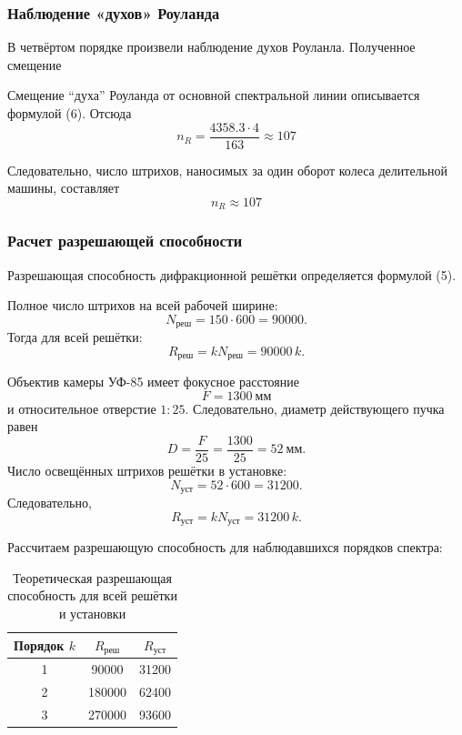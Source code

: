 \documentclass[12pt,a5paper,titlepage, main = russian]{article}
\begin{document}
\subsubsection{Наблюдение «духов» Роуланда}
В четвёртом порядке произвели наблюдение духов Роуланла. Полученное смещение

\begin{table}[H]
\centering
 \renewcommand{\arraystretch}{1.5}
\caption{Результаты наблюдения духа Роуланда в четвёртом порядке}
\end{table}

Смещение ``духа'' Роуланда от основной спектральной линии описывается формулой (6). Отсюда
\[
n_R = \frac{4358.3 \cdot 4}{163} \approx 107
\]

Следовательно, число штрихов, наносимых за один оборот колеса делительной машины, составляет
\[
\boxed{n_R \approx 107}
\]
\subsubsection{Расчет разрешающей способности}
Разрешающая способность дифракционной решётки определяется формулой
(5).

Полное число штрихов на всей рабочей ширине:
\[
N_{\text{реш}} = 150 \cdot 600 = 90000.
\]
Тогда для всей решётки:
\[
R_{\text{реш}} = k N_{\text{реш}} = 90000\,k.
\]

Объектив камеры УФ-85 имеет фокусное расстояние
\[
F = 1300\ \text{мм}
\]
и относительное отверстие \(1:25\). Следовательно, диаметр действующего пучка равен
\[
D = \frac{F}{25} = \frac{1300}{25} = 52\ \text{мм}.
\]
Число освещённых штрихов решётки в установке:
\[
N_{\text{уст}} = 52 \cdot 600 = 31200.
\]
Следовательно,
\[
R_{\text{уст}} = k N_{\text{уст}} = 31200\,k.
\]

Рассчитаем разрешающую способность для наблюдавшихся порядков спектра:

\begin{table}[H]
\centering
\begin{tabular}{|c|c|c|}
\hline
Порядок $k$ & $R_{\text{реш}}$ & $R_{\text{уст}}$ \\
\hline
1 & 90000 & 31200 \\
2 & 180000 & 62400 \\
3 & 270000 & 93600 \\
\hline
\end{tabular}
\caption{Теоретическая разрешающая способность для всей решётки и установки}
\end{table}
\end{document}
